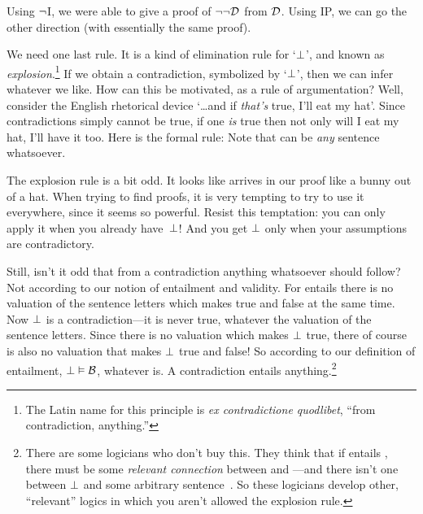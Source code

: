 Using $\neg$I, we were able to give a proof of $\neg\neg\mathcal{D}$ from $\mathcal{D}$. Using IP, we can go the other direction (with essentially the same proof).
	\begin{fitchproof}
		\PR
		\open
			\AS
		\close
	\end{fitchproof}

We need one last rule. It is a kind of elimination rule for `$\bot$', and known as \emph{explosion}.\footnote{The Latin name for this principle is \emph{ex contradictione quodlibet}, ``from contradiction, anything.''} If we obtain a contradiction, symbolized by `$\bot$', then we can infer whatever we like. How can this be motivated, as a rule of argumentation? Well, consider the English rhetorical device `\ldots and if \emph{that's} true, I'll eat my hat'. Since contradictions simply cannot be true, if one \emph{is} true then not only will I eat my hat, I'll have it too. Here is the formal rule:
Note that  can be \emph{any} sentence whatsoever.

The explosion rule is a bit odd. It looks like  arrives in our proof like a bunny out of a hat. When trying to find proofs, it is very tempting to try to use it everywhere, since it seems so powerful. Resist this temptation: you can only apply it when you already have~$\bot$!  And you get $\bot$ only when your assumptions are contradictory.

Still, isn't it odd that from a contradiction anything whatsoever should follow? Not according to our notion of entailment and validity. For  entails  \ifeff{} there is no valuation of the sentence letters which makes  true and  false at the same time. Now $\bot$ is a contradiction---it is never true, whatever the valuation of the sentence letters. Since there is no valuation which makes $\bot$ true, there of course is also no valuation that makes $\bot$ true and  false! So according to our definition of entailment, $\bot \vDash \mathcal{B}$, whatever  is. A contradiction entails anything.\footnote{There are some logicians who don't buy this. They think that if  entails , there must be some \emph{relevant connection} between  and ---and there isn't one between $\bot$ and some arbitrary sentence~. So these logicians develop other, ``relevant'' logics in which you aren't allowed the explosion rule.}

